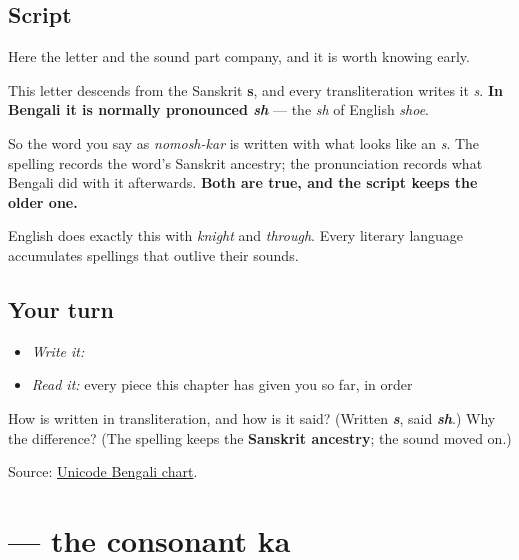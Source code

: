 \subsection*{Script}
\begin{quote}
\end{quote}

Here the letter and the sound part company, and it is worth knowing early.

This letter descends from the Sanskrit \textbf{s}, and every transliteration writes it \emph{s}. \textbf{In Bengali it is normally pronounced \emph{sh}} — the \emph{sh} of English \emph{shoe}.

So the word you say as \emph{nomosh-kar} is written with what looks like an \emph{s}. The spelling records the word's Sanskrit ancestry; the pronunciation records what Bengali did with it afterwards. \textbf{Both are true, and the script keeps the older one.}

English does exactly this with \emph{knight} and \emph{through}. Every literary language accumulates spellings that outlive their sounds.

\subsection*{Your turn}
\begin{itemize}
\raggedright
  \item \emph{Write it:} 
  \item \emph{Read it:} every piece this chapter has given you so far, in order
\end{itemize}

\begin{tcolorbox}[breakable,colback=teal!4,colframe=teal!35!black,title={Before you move on}]
How is \textbf{} written in transliteration, and how is it said? (Written \emph{\textbf{s}}, said \emph{\textbf{sh}}.) Why the difference? (The spelling keeps the \textbf{Sanskrit ancestry}; the sound moved on.)

Source: \href{https://www.unicode.org/charts/PDF/U0980.pdf}{Unicode Bengali chart}.
\end{tcolorbox}
\section[\texorpdfstring{\bn{ক} (kô)}{ক (kô)}]{ — the consonant ka}

\label{lesson:BN-W01-ka}




